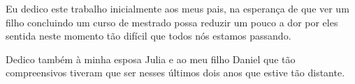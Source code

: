 Eu dedico este trabalho inicialmente aos meus pais, na esperança de que ver um
filho concluindo um curso de mestrado possa reduzir um pouco a dor por eles
sentida neste momento tão difícil que todos nós estamos passando.

Dedico também à minha esposa Julia e ao meu filho Daniel que tão compreensivos
tiveram que ser nesses últimos dois anos que estive tão distante.
